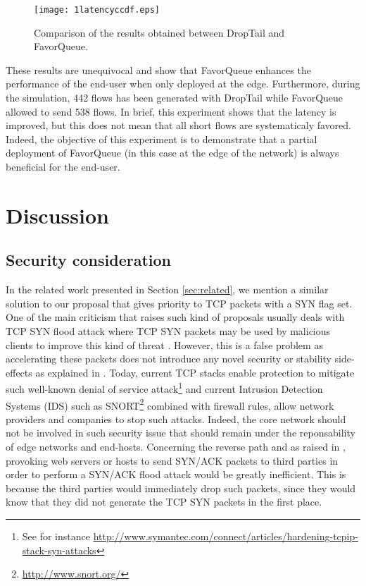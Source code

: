 \documentclass{elsart}
\begin{document}
\begin{figure}[htb!]
   	\centering
\texttt{[image: 1latencyccdf.eps]}
	\caption{Comparison of the results obtained between DropTail and FavorQueue.}
	\label{fig:5hops_results}
\end{figure}

These results are unequivocal and show that FavorQueue enhances the performance of the end-user when only deployed at the edge. Furthermore, during the simulation, 442 flows has been generated with DropTail while FavorQueue allowed to send 538 flows. In brief, this experiment shows that the latency is improved, but this does not mean that all short flows are systematicaly favored. Indeed, the objective of this experiment is to demonstrate that a partial deployment of FavorQueue (in this case at the edge of the network) is always beneficial for the end-user. 

\section{Discussion}
\label{sec:discuss}

\subsection{Security consideration}

In the related work presented in Section \ref{sec:related}, we mention a similar solution to our proposal that gives priority to TCP packets with a SYN flag set. One of the main criticism 
that raises such kind of proposals usually deals with TCP SYN flood attack where TCP SYN packets may be used by malicious clients to improve this kind of threat \cite{rfc4987}.
However, this is a false problem as accelerating these packets does not introduce any novel security or stability side-effects as explained in \cite{Kuzmanovic05}.
Today, current TCP stacks enable protection to mitigate such well-known 
denial of service attack\footnote{See for instance \url{http://www.symantec.com/connect/articles/hardening-tcpip-stack-syn-attacks}} and current Intrusion Detection Systems (IDS) such as SNORT\footnote{\url{http://www.snort.org/}} 
combined with firewall rules, allow network providers and companies to stop such attacks. 
Indeed, the core network should not be involved in such security issue that should remain under the reponsability of edge networks and end-hosts.
Concerning the reverse path and as raised in \cite{Kuzmanovic05}, provoking web servers or hosts to send SYN/ACK packets to third parties in order to perform a SYN/ACK flood attack would be greatly inefficient. 
This is because the third parties would immediately drop such packets, since they would know that they did not generate the TCP SYN packets in the first place.
\end{document}
